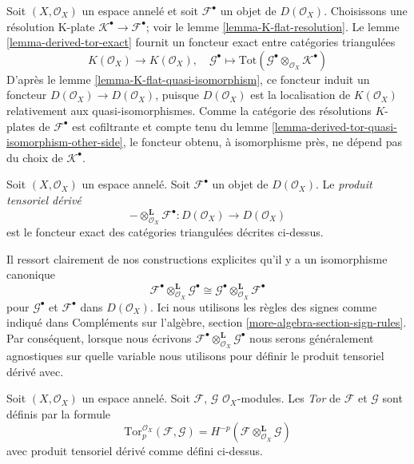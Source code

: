 \noindent
Soit $(X, \mathcal{O}_X)$ un espace annelé et soit $\mathcal{F}^\bullet$ un objet de $D(\mathcal{O}_X)$. Choisissons une résolution K-plate $\mathcal{K}^\bullet \to \mathcal{F}^\bullet$; voir le lemme \ref{lemma-K-flat-resolution}. Le lemme \ref{lemma-derived-tor-exact} fournit un foncteur exact entre catégories triangulées $$
K(\mathcal{O}_X)
\longrightarrow
K(\mathcal{O}_X),
\quad
\mathcal{G}^\bullet
\longmapsto
\text{Tot}(\mathcal{G}^\bullet \otimes_{\mathcal{O}_X} \mathcal{K}^\bullet)
$$ D'après le lemme \ref{lemma-K-flat-quasi-isomorphism}, ce foncteur induit un foncteur $D(\mathcal{O}_X) \to D(\mathcal{O}_X)$, puisque $D(\mathcal{O}_X)$ est la localisation de $K(\mathcal{O}_X)$ relativement aux quasi-isomorphismes. Comme la catégorie des résolutions $K$-plates de $\mathcal{F}^\bullet$ est cofiltrante et compte tenu du lemme \ref{lemma-derived-tor-quasi-isomorphism-other-side}, le foncteur obtenu, à isomorphisme près, ne dépend pas du choix de $\mathcal{K}^\bullet$.

\begin{definition}

\label{definition-derived-tor}
Soit $(X, \mathcal{O}_X)$ un espace annelé. Soit $\mathcal{F}^\bullet$ un objet de $D(\mathcal{O}_X)$. Le {\it produit tensoriel dérivé} $$
- \otimes_{\mathcal{O}_X}^{\mathbf{L}} \mathcal{F}^\bullet :
D(\mathcal{O}_X)
\longrightarrow
D(\mathcal{O}_X)
$$ est le foncteur exact des catégories triangulées décrites ci-dessus.
\end{definition}

\noindent
Il ressort clairement de nos constructions explicites qu'il y a un isomorphisme canonique $$
\mathcal{F}^\bullet \otimes_{\mathcal{O}_X}^{\mathbf{L}} \mathcal{G}^\bullet
\cong
\mathcal{G}^\bullet \otimes_{\mathcal{O}_X}^{\mathbf{L}} \mathcal{F}^\bullet
$$ pour $\mathcal{G}^\bullet$ et $\mathcal{F}^\bullet$ dans $D(\mathcal{O}_X)$. Ici nous utilisons les règles des signes comme indiqué dans Compléments sur l'algèbre, section \ref{more-algebra-section-sign-rules}. Par conséquent, lorsque nous écrivons $\mathcal{F}^\bullet \otimes_{\mathcal{O}_X}^{\mathbf{L}} \mathcal{G}^\bullet$ nous serons généralement agnostiques sur quelle variable nous utilisons pour définir le produit tensoriel dérivé avec.

\begin{definition}

\label{definition-tor}
Soit $(X, \mathcal{O}_X)$ un espace annelé. Soit $\mathcal{F}$, $\mathcal{G}$ $\mathcal{O}_X$-modules. Les {\it Tor} de $\mathcal{F}$ et $\mathcal{G}$ sont définis par la formule $$
\text{Tor}_p^{\mathcal{O}_X}(\mathcal{F}, \mathcal{G}) =
H^{-p}(\mathcal{F} \otimes_{\mathcal{O}_X}^\mathbf{L} \mathcal{G})
$$ avec produit tensoriel dérivé comme défini ci-dessus.
\end{definition}

